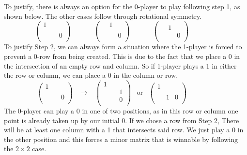 \documentclass[11pt]{article}
\newcommand{\keywordfont}{\textsc}
\newcommand{\keyword}[1]{%
  \marginpar{\raggedright\small\keywordfont{#1}}}
\begin{document}
To justify, \keyword{Justify} there is always an option for the 0-player to play following step 1, as shown below. The other cases follow through rotational symmetry.
\[ \left( \begin{array}{cc|c}
1 & \ & \ \\
\ & \ & \ \\
\hline
\ & \ & 0 \\
\end{array} \right)
\hspace{40pt}
%
\left( \begin{array}{cc|c}
\ & 1 & \ \\
\ & \ & \ \\
\hline
\ & \ & 0 \\
\end{array} \right)
\hspace{40pt}
%
\left( \begin{array}{cc|c}
\ & \ & \ \\
\ & 1 & \ \\
\hline
\ & \ & 0 \\
\end{array} \right)
\hspace{50pt}
%
\]
To justify Step 2, we can always form a situation where the 1-player is forced to prevent a 0-row from being created. This is due to the fact that we place a 0 in the intersection of an empty row and column. So if 1-player plays a 1 in either the row or column, we can place a 0 in the column or row. 
\[ \left( \begin{array}{cc|c}
1 & \ & \ \\
\ & \ & \ \\
\hline
\ & \ & 0 \\
\end{array} \right)
\hspace{10pt} \rightarrow\hspace{10pt}
%
\left( \begin{array}{ccc}
1 & \ & \ \\
\ & \ & 1 \\
\hline
\ & \ & 0 \\
\end{array} \right)
\hspace{10pt} \text{or} \hspace{10pt}
%
\left( \begin{array}{cc|c}
1 & \ & \ \\
\ & \ & \ \\
\ & 1 & 0 \\
\end{array} \right)
\hspace{50pt}
%
\]
The 0-player can play a 0 in one of two positions, as in this row or column one point is already taken up by our initial 0. If we chose a row from Step 2, There will be at least one column with a 1 that intersects said row. We just play a 0 in the other position and this forces a minor matrix that is winnable by following the $2 \times 2$ case.
\end{document}
